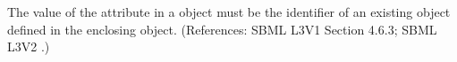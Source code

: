 The value of the attribute  in a \Species object must be
the identifier of an existing \Compartment object defined in the enclosing
\Model object.  (References: SBML L3V1 Section 4.6.3; SBML L3V2
.)
